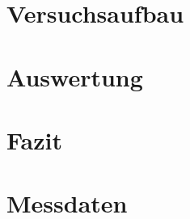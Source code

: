 \documentclass[
    oneside, 
    footinclude=off, 
    captions=tableheading, 
    DIV=12;usenames,
    dvipsnames
]{scrartcl}
\begin{document}
\newpage
\section{Versuchsaufbau} %
    

\newpage
\section{Auswertung}
    

\newpage
\section{Fazit}
    


\newpage
    
\newpage
    \listoffigures
    \listoftables


\newpage
    \section*{Messdaten}
    
\newpage
    



%
\end{document}
